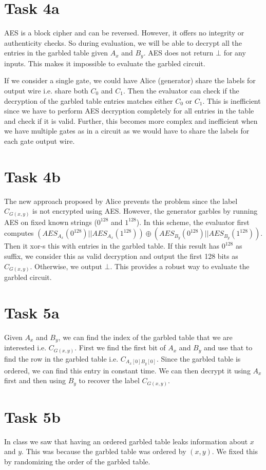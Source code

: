 \documentclass{article}
\begin{document}
    \section*{Task 4a}
    AES is a block cipher and can be reversed. However, it offers no integrity or authenticity checks. So during evaluation, we will be able to decrypt all the entries in the garbled table given $A_x$ and $B_y$. AES does not return $\bot$ for any inputs. This makes it impossible to evaluate the garbled circuit.

    If we consider a single gate, we could have Alice (generator) share the labels for output wire i.e. share both $C_0$ and $C_1$. Then the evaluator can check if the decryption of the garbled table entries matches either $C_0$ or $C_1$. This is inefficient since we have to perform AES decryption completely for all entries in the table and check if it is valid. Further, this becomes more complex and inefficient when we have multiple gates as in a circuit as we would have to share the labels for each gate output wire.

    \section*{Task 4b}
    The new approach proposed by Alice prevents the problem since the label $C_{G(x, y)}$ is not encrypted using AES. However, the generator garbles by running AES on fixed known strings ($0^{128}$ and $1^{128}$). In this scheme, the evaluator first computes $(AES_{A_x}(0^{128}) || AES_{A_x}(1^{128})) \oplus (AES_{B_y}(0^{128}) || AES_{B_y}(1^{128}))$. Then it xor-s this with entries in the garbled table. If this result has $0^{128}$ as suffix, we consider this as valid decryption and output the first 128 bits as $C_{G(x, y)}$. Otherwise, we output $\bot$. This provides a robust way to evaluate the garbled circuit.

    \section*{Task 5a}
    Given $A_x$ and $B_y$, we can find the index of the garbled table that we are interested i.e. $C_{G(x, y)}$. First we find the first bit of $A_x$ and $B_y$ and use that to find the row in the garbled table i.e. $C_{A_x[0]B_y[0]}$. Since the garbled table is ordered, we can find this entry in constant time. We can then decrypt it using $A_x$ first and then using $B_y$ to recover the label $C_{G(x, y)}$.

    \section*{Task 5b}
    In class we saw that having an ordered garbled table leaks information about $x$ and $y$. This was because the garbled table was ordered by $(x, y)$. We fixed this by randomizing the order of the garbled table.
\end{document}
